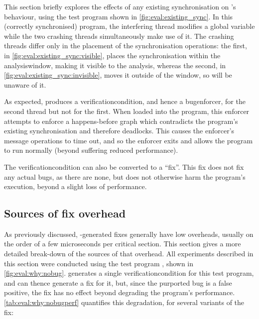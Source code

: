 \noindent
This section briefly explores the effects of any existing
synchronisation on {\technique}'s behaviour, using the test program
shown in \autoref{fig:eval:existing_sync}.  In this (correctly
synchronised) program, the interfering thread modifies a global
variable while the two crashing threads simultaneously make use of it.
The crashing threads differ only in the placement of the
synchronisation operations: the first, in
\autoref{fig:eval:existing_sync:visible}, places the synchronisation
within the \gls{analysiswindow}, making it visible to the {\technique}
analysis, whereas the second, in
\autoref{fig:eval:existing_sync:invisible}, moves it outside of the
window, so {\technique} will be unaware of it.

As expected, {\implementation} produces a \gls{verificationcondition}, and
hence a \gls{bugenforcer}, for the second thread but not for the
first.  When loaded into the program, this enforcer attempts to
enforce a happens-before graph which contradicts the program's
existing synchronisation and therefore deadlocks.  This causes the
enforcer's message operations to time out, and so the enforcer exits
and allows the program to run normally (beyond suffering reduced
performance).

The \gls{verificationcondition} can also be converted to a ``fix''.
This fix does not fix any actual bugs, as there are none, but does not
otherwise harm the program's execution, beyond a slight loss of
performance.

\subsection{Sources of fix overhead}
\label{sect:eval:why:fix_overhead}

As previously discussed, {\implementation}-generated fixes generally have
low overheads, usually on the order of a few microseconds per critical
section.  This section gives a more detailed break-down of the sources
of that overhead.  All experiments described in this section were
conducted using the test program , shown in
\autoref{fig:eval:why:nobug}.  {\implementation} generates a single
\gls{verificationcondition} for this test program, and can thence
generate a fix for it, but, since the purported bug is a false
positive, the fix has no effect beyond degrading the program's
performance.  \autoref{tab:eval:why:nobugperf} quantifies this
degradation, for several variants of the fix:



